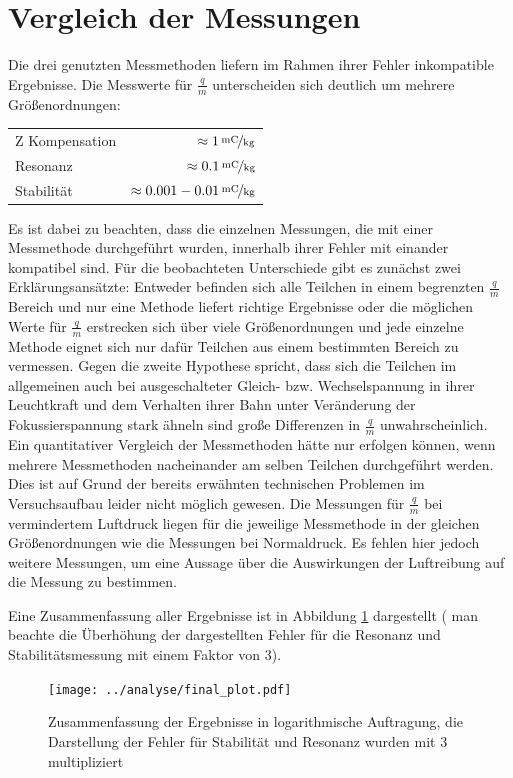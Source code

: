 \documentclass[a4paper,12pt]{article}
\begin{document}
\section{Vergleich der Messungen}
Die drei genutzten Messmethoden liefern im Rahmen ihrer Fehler inkompatible Ergebnisse. Die Messwerte für $\frac{q}{m}$ unterscheiden sich deutlich um mehrere Größenordnungen:
\begin{table}[h]
	\centering
	\begin{tabular}{lr}
		Z Kompensation  & $\approx \unitfrac[ 1 ]{mC}{kg}$\\
		Resonanz & $\approx \unitfrac[ 0.1 ]{mC}{kg}$\\
		Stabilität &  $\approx \unitfrac[ 0.001-0.01 ]{mC}{kg}$\\
	\end{tabular}
	\label{result_compare}
\end{table}
Es ist dabei zu beachten, dass die einzelnen Messungen, die mit einer Messmethode durchgeführt wurden, innerhalb ihrer Fehler
mit einander kompatibel sind.
Für die beobachteten Unterschiede gibt es zunächst zwei Erklärungsansätzte:
Entweder befinden sich alle Teilchen in einem begrenzten $\frac{q}{m}$ Bereich und nur eine Methode liefert 
richtige Ergebnisse oder die möglichen Werte für $\frac{q}{m}$ erstrecken sich über viele Größenordnungen
und jede einzelne Methode eignet sich nur dafür Teilchen aus einem bestimmten Bereich zu vermessen.
Gegen die zweite Hypothese spricht, dass sich die Teilchen im allgemeinen auch bei ausgeschalteter Gleich- bzw. Wechselspannung in ihrer 
Leuchtkraft und dem Verhalten ihrer Bahn unter Veränderung der Fokussierspannung stark ähneln 
sind große Differenzen in $\frac{q}{m}$ unwahrscheinlich. Ein quantitativer Vergleich der Messmethoden hätte nur erfolgen können,
wenn mehrere Messmethoden nacheinander am selben Teilchen durchgeführt werden. Dies ist auf Grund der bereits erwähnten
technischen Problemen im Versuchsaufbau leider nicht möglich gewesen. Die Messungen für $\frac{q}{m}$ bei vermindertem Luftdruck liegen für die 
jeweilige Messmethode in der gleichen Größenordnungen wie die Messungen bei Normaldruck. Es fehlen hier jedoch weitere Messungen, um eine Aussage
über die Auswirkungen der Luftreibung auf die Messung zu bestimmen.

Eine Zusammenfassung aller Ergebnisse ist in Abbildung \ref{final_plot} dargestellt 
( man beachte die Überhöhung der dargestellten Fehler für die Resonanz und Stabilitätsmessung mit einem Faktor von 3).
\begin{figure}[htb]
		\centering
		\texttt{[image: ../analyse/final\_plot.pdf]}\\
		\caption{Zusammenfassung der Ergebnisse in logarithmische Auftragung, die Darstellung der Fehler für Stabilität und Resonanz wurden mit 3 multipliziert}
		\label{final_plot}
\end{figure}
\end{document}
